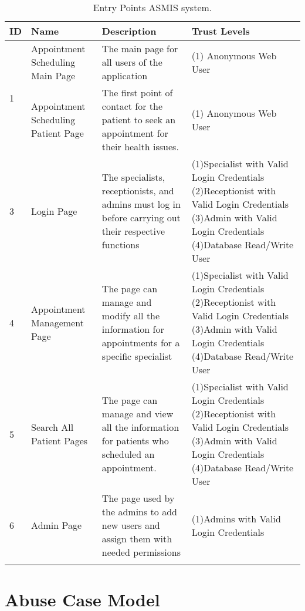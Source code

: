 \centering
\setlength{\tabcolsep}{6.5pt} %
\renewcommand{\arraystretch}{1.8} %
\begin{longtable}{ |p{3cm}|p{3cm}|p{5cm}| p{3cm} |}
 \hline
 \textbf{ID} & \textbf{Name} & \textbf{Description} & \textbf{Trust Levels} \\ [0.5ex] 
 \hline
 \multirow{2}{5em}{1} & Appointment Scheduling Main Page & The main page for all users of the application & (1) Anonymous Web User \\
 \hline
 \multirow{2}{5em}{2} & Appointment Scheduling Patient Page & The first point of contact for the patient to seek an appointment for their health issues. & (1) Anonymous Web User \\
 \hline
 3 & Login Page & The specialists, receptionists, and admins must log in before carrying out their respective functions & 
 (1)Specialist with Valid Login Credentials \newline
 (2)Receptionist with Valid Login Credentials \newline
 (3)Admin with Valid Login Credentials \newline
 (4)Database Read/Write User
 \\
 \hline
 4 & Appointment Management Page & The page can manage and modify all the information for appointments for a specific specialist & 
 (1)Specialist with Valid Login Credentials \newline
 (2)Receptionist with Valid Login Credentials \newline
 (3)Admin with Valid Login Credentials \newline
 (4)Database Read/Write User\\
 \hline
  5 & Search All Patient Pages & The page can manage and view all the information for patients who scheduled an appointment. & 
 (1)Specialist with Valid Login Credentials \newline
 (2)Receptionist with Valid Login Credentials \newline
 (3)Admin with Valid Login Credentials \newline
 (4)Database Read/Write User
 \\
 \hline
 6 & Admin Page & The page used by the admins to add new users and assign them with needed permissions & 
 (1)Admins with Valid Login Credentials \newline \\
 \hline
 \caption{Entry Points ASMIS system.}
    \label{table:entry_points}
\end{longtable}

\section{Abuse Case Model}
